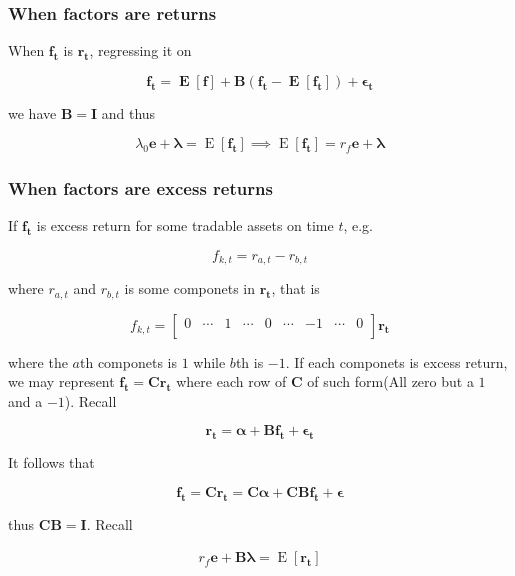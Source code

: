 \documentclass{article}
\begin{document}
\hypertarget{when-factors-are-returns}{%
\subsubsection{When factors are
returns}\label{when-factors-are-returns}}

When \(\bm{\mathbf{f_t}}\) is \(\bm{\mathbf{r_t}}\), regressing it on

\[\bm{\mathbf{f_t=\mathop{\text{E}}[f]+B(f_t-\mathop{\text{E}}[f_t])+\epsilon_t}} \]

we have \(\bm{\mathbf{B=I}}\) and thus

\[ \lambda_0 \bm{\mathbf{e}}+\bm{\mathbf{\lambda}}=\mathop{\text{E}}[\bm{\mathbf{f_t}}]\implies \mathop{\text{E}}[\bm{\mathbf{f_t}}]=\bm{\mathbf{\mathit{r_f}e+\lambda }}  \]

\hypertarget{when-factors-are-excess-returns}{%
\subsubsection{When factors are excess
returns}\label{when-factors-are-excess-returns}}

If \(\bm{\mathbf{f_t}}\) is excess return for some tradable assets on
time \(t\), e.g.~

\[ f_{k,t}=r_{a,t}-r_{b,t} \]

where \(r_{a,t}\) and \(r_{b,t}\) is some componets in
\(\bm{\mathbf{r_t}}\), that is

\[ f_{k,t}=\begin{bmatrix}
  0&\cdots&1&\cdots&0&\cdots&-1&\cdots&0\\
\end{bmatrix}\bm{\mathbf{r_t}} \]

where the \(a\)th componets is \(1\) while \(b\)th is \(-1\). If each
componets is excess return, we may represent \(\bm{\mathbf{f_t=Cr_t}}\)
where each row of \(\bm{\mathbf{C}}\) of such form(All zero but a \(1\)
and a \(-1\)). Recall

\[ \bm{\mathbf{r_t=\alpha+Bf_t+\epsilon_t}} \]

It follows that

\[ \bm{\mathbf{f_t=Cr_t=C\alpha+CBf_t+\epsilon}} \]

thus \(\bm{\mathbf{CB=I}}\). Recall

\[ \begin{aligned}
  r_f \bm{\mathbf{e}}+\bm{\mathbf{B\lambda}}=\mathop{\text{E}}[\bm{\mathbf{r_t}}]
\end{aligned} \]
\end{document}
